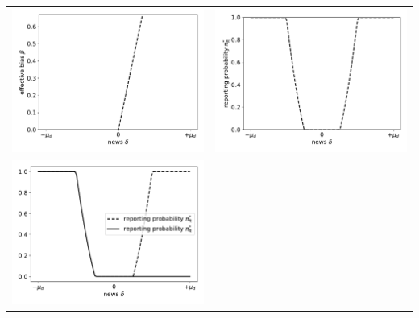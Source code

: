 \documentclass{article}
\begin{document}
\begin{tabular}{cc}
	\includegraphics[scale=.5]{news_effective_bias} & \includegraphics[scale=.5]{news_reporting_probability} \\
	\includegraphics[scale=.5]{news_reporting_probability_reporting_probability} & 
\end{tabular}
\end{document}
